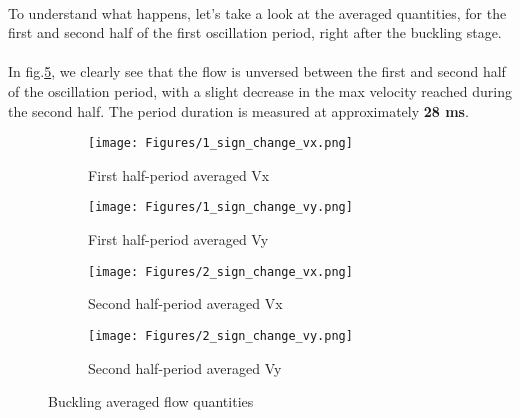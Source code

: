 \documentclass[a4paper,10pt]{report}
\begin{document}
\paragraph{}
To understand what happens, let's take a look at the averaged quantities, for the first and second half of the first oscillation period, right after the buckling stage.
\paragraph{}
In fig.\ref{fig:fsAveragedquantities}, we clearly see that the flow is unversed between the first and second half of the oscillation period, with a slight decrease in the max velocity reached during the second half. The period duration is measured at approximately \textbf{28 ms}.
\begin{figure}[htbp]%
	\centering%
	 \begin{subfigure}[t]{0.5\textwidth}%
        \texttt{[image: Figures/1\_sign\_change\_vx.png]}%
        \caption{First half-period averaged Vx}%
				\label{fig:FirsthalfperiodaveragedVx}%
    \end{subfigure}%
		\begin{subfigure}[t]{0.5\textwidth}%
				\texttt{[image: Figures/1\_sign\_change\_vy.png]}%
        \caption{First half-period averaged Vy}%
				\label{fig:FirsthalfperiodaveragedVy}%
    \end{subfigure}%
		
    \begin{subfigure}[t]{0.5\textwidth}%
        \texttt{[image: Figures/2\_sign\_change\_vx.png]}%
        \caption{Second half-period averaged Vx}%
				\label{fig:SecondhalfperiodaveragedVx}%
    \end{subfigure}%
		\begin{subfigure}[t]{0.5\textwidth}%
        \texttt{[image: Figures/2\_sign\_change\_vy.png]}%
        \caption{Second half-period averaged Vy}%
				\label{fig:SecondhalfperiodaveragedVy}%
    \end{subfigure}%
		\caption{Buckling averaged flow quantities}%
		\label{fig:fsAveragedquantities}%
\end{figure}
\end{document}
